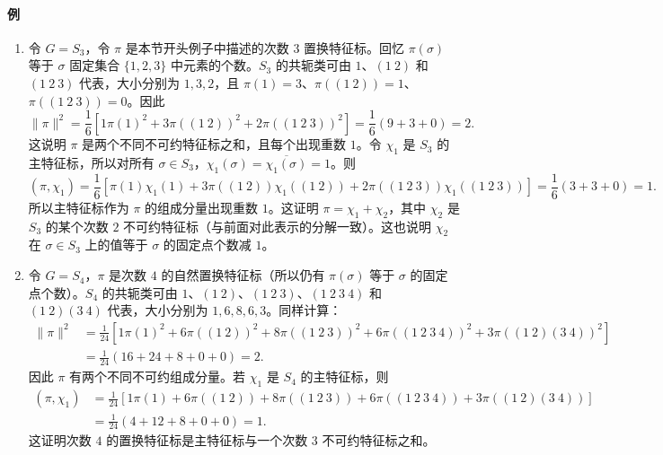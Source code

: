 \paragraph{例}
\begin{enumerate}[label=(\arabic*)]
  \item 令 $G=S_3$，令 $\pi$ 是本节开头例子中描述的次数 $3$ 置换特征标。回忆 $\pi(\sigma)$ 等于 $\sigma$ 固定集合 $\{1,2,3\}$ 中元素的个数。$S_3$ 的共轭类可由 $1$、$(1\ 2)$ 和 $(1\ 2\ 3)$ 代表，大小分别为 $1,3,2$，且 $\pi(1)=3$、$\pi((1\ 2))=1$、$\pi((1\ 2\ 3))=0$。因此
  \[
    \|\pi\|^2=\frac16\left[1\pi(1)^2+3\pi((1\ 2))^2+2\pi((1\ 2\ 3))^2\right]
    =\frac16(9+3+0)=2.
  \]
  这说明 $\pi$ 是两个不同不可约特征标之和，且每个出现重数 $1$。令 $\chi_1$ 是 $S_3$ 的主特征标，所以对所有 $\sigma\in S_3$，$\chi_1(\sigma)=\overline{\chi_1(\sigma)}=1$。则
  \[
    (\pi,\chi_1)=\frac16\left[\pi(1)\chi_1(1)+3\pi((1\ 2))\chi_1((1\ 2))+2\pi((1\ 2\ 3))\chi_1((1\ 2\ 3))\right]
    =\frac16(3+3+0)=1.
  \]
  所以主特征标作为 $\pi$ 的组成分量出现重数 $1$。这证明 $\pi=\chi_1+\chi_2$，其中 $\chi_2$ 是 $S_3$ 的某个次数 $2$ 不可约特征标（与前面对此表示的分解一致）。这也说明 $\chi_2$ 在 $\sigma\in S_3$ 上的值等于 $\sigma$ 的固定点个数减 $1$。

  \item 令 $G=S_4$，$\pi$ 是次数 $4$ 的自然置换特征标（所以仍有 $\pi(\sigma)$ 等于 $\sigma$ 的固定点个数）。$S_4$ 的共轭类可由 $1$、$(1\ 2)$、$(1\ 2\ 3)$、$(1\ 2\ 3\ 4)$ 和 $(1\ 2)(3\ 4)$ 代表，大小分别为 $1,6,8,6,3$。同样计算：
  \[
  \begin{aligned}
    \|\pi\|^2
    &=\frac1{24}[1\pi(1)^2+6\pi((1\ 2))^2+8\pi((1\ 2\ 3))^2
      +6\pi((1\ 2\ 3\ 4))^2+3\pi((1\ 2)(3\ 4))^2]\\
    &=\frac1{24}(16+24+8+0+0)=2.
  \end{aligned}
  \]
  因此 $\pi$ 有两个不同不可约组成分量。若 $\chi_1$ 是 $S_4$ 的主特征标，则
  \[
  \begin{aligned}
    (\pi,\chi_1)
    &=\frac1{24}[1\pi(1)+6\pi((1\ 2))+8\pi((1\ 2\ 3))
      +6\pi((1\ 2\ 3\ 4))+3\pi((1\ 2)(3\ 4))]\\
    &=\frac1{24}(4+12+8+0+0)=1.
  \end{aligned}
  \]
  这证明次数 $4$ 的置换特征标是主特征标与一个次数 $3$ 不可约特征标之和。


\end{enumerate}
